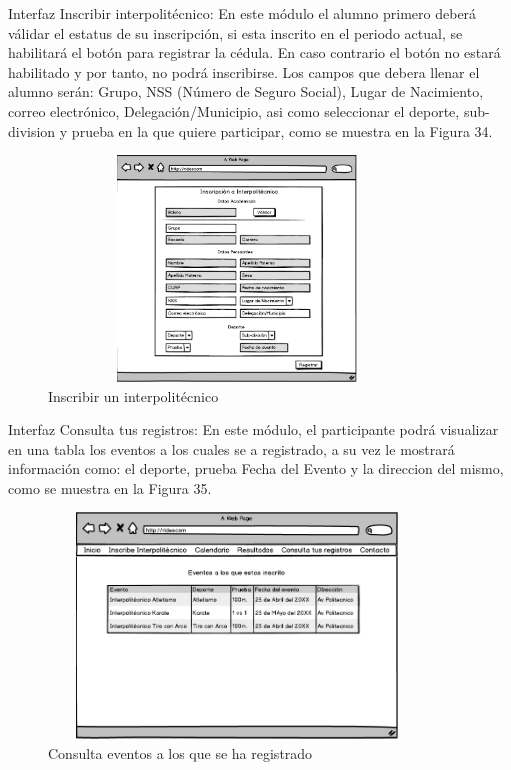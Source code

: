 	Interfaz Inscribir interpolitécnico: En este módulo el alumno primero deberá válidar el estatus de su inscripción, si esta inscrito en el periodo actual, se habilitará el botón para registrar la cédula. En caso contrario el botón no estará habilitado y por tanto, no podrá inscribirse. Los campos que debera llenar el alumno serán: Grupo, NSS (Número de Seguro Social), Lugar de Nacimiento, correo electrónico, Delegación/Municipio, asi como seleccionar el deporte, sub-division y prueba en la que quiere participar, como se muestra en la Figura 34.
	\begin{figure}[hbt!]
		\centering
		\includegraphics[width=10cm, height=6cm]{Imagenes/Disenos/Inscripcioninter.png}
		\caption{Inscribir un interpolitécnico}
	\end{figure}
	\pagebreak
	
	Interfaz Consulta tus registros: En este módulo, el participante podrá visualizar en una tabla los eventos a los cuales se a registrado, a su vez le mostrará información como: el deporte, prueba Fecha del Evento y la direccion del mismo, como se muestra en la Figura 35.
	\begin{figure}[hbt!]
		\centering
		\includegraphics[width=10cm, height=6cm]{Imagenes/Disenos/Consultainscripciones.png}
		\caption{Consulta eventos a los que se ha registrado}
	\end{figure}
	
